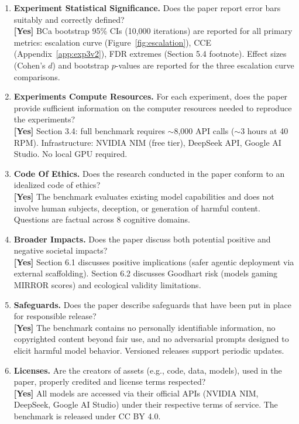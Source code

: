 \documentclass[10pt]{article}
\begin{document}
\begin{enumerate}
\item \textbf{Experiment Statistical Significance.} Does the paper report error bars suitably and correctly defined?
\\\textbf{[Yes]} BCa bootstrap 95\% CIs (10{,}000 iterations) are reported for all primary metrics: escalation curve (Figure~\ref{fig:escalation}), CCE (Appendix~\ref{app:exp3v2}), FDR extremes (Section 5.4 footnote). Effect sizes (Cohen's $d$) and bootstrap $p$-values are reported for the three escalation curve comparisons.

\item \textbf{Experiments Compute Resources.} For each experiment, does the paper provide sufficient information on the computer resources needed to reproduce the experiments?
\\\textbf{[Yes]} Section 3.4: full benchmark requires $\sim$8{,}000 API calls ($\sim$3 hours at 40 RPM). Infrastructure: NVIDIA NIM (free tier), DeepSeek API, Google AI Studio. No local GPU required.

\item \textbf{Code Of Ethics.} Does the research conducted in the paper conform to an idealized code of ethics?
\\\textbf{[Yes]} The benchmark evaluates existing model capabilities and does not involve human subjects, deception, or generation of harmful content. Questions are factual across 8 cognitive domains.

\item \textbf{Broader Impacts.} Does the paper discuss both potential positive and negative societal impacts?
\\\textbf{[Yes]} Section 6.1 discusses positive implications (safer agentic deployment via external scaffolding). Section 6.2 discusses Goodhart risk (models gaming MIRROR scores) and ecological validity limitations.

\item \textbf{Safeguards.} Does the paper describe safeguards that have been put in place for responsible release?
\\\textbf{[Yes]} The benchmark contains no personally identifiable information, no copyrighted content beyond fair use, and no adversarial prompts designed to elicit harmful model behavior. Versioned releases support periodic updates.

\item \textbf{Licenses.} Are the creators of assets (e.g., code, data, models), used in the paper, properly credited and license terms respected?
\\\textbf{[Yes]} All models are accessed via their official APIs (NVIDIA NIM, DeepSeek, Google AI Studio) under their respective terms of service. The benchmark is released under CC BY 4.0.


\end{enumerate}
\end{document}
